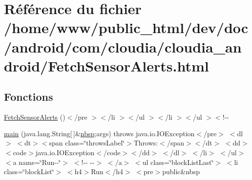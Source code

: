 \hypertarget{cloudia__android_2_fetch_sensor_alerts_8html}{\section{Référence du fichier /home/www/public\-\_\-html/dev/doc/android/com/cloudia/cloudia\-\_\-android/\-Fetch\-Sensor\-Alerts.html}
\label{cloudia__android_2_fetch_sensor_alerts_8html}
}
\subsection*{Fonctions}
\begin{DoxyCompactItemize}
\item 
\hyperlink{cloudia__android_2_fetch_sensor_alerts_8html_a0ca9d44baa13a9bbfa02515b8fdcadc0}{Fetch\-Sensor\-Alerts} ()$<$/pre $>$$<$/li $>$$<$/ul $>$$<$/li $>$$<$/ul $>$$<$!-\/-\/
\item 
\hyperlink{cloudia__android_2_fetch_sensor_alerts_8html_a0096c0bd079e6b0a3d0a15d6429c3f59}{main} (java.\-lang.\-String\mbox{[}$\,$\mbox{]}\&\hyperlink{_tools_8html_aef915316f784c9063d942974538301a6}{nbsp};args)  throws java.\-io.\-I\-O\-Exception$<$/pre$>$ $<$dl$>$ $<$dt$>$$<$span class=\char`\"{}throws\-Label\char`\"{}$>$\-Throws\-:$<$/span$>$$<$/dt$>$ $<$dd$>$$<$code$>$java.\-io.\-I\-O\-Exception$<$/code$>$$<$/dd$>$ $<$/dl$>$ $<$/li$>$ $<$/ul$>$ $<$a name=\char`\"{}\-Run-\/-\/\char`\"{}$>$ $<$!-\/-\/   -\/-\/$>$ $<$/a$>$ $<$ul class=\char`\"{}block\-List\-Last\char`\"{}$>$ $<$li class=\char`\"{}block\-List\char`\"{}$>$ $<$h4$>$\-Run$<$/h4$>$ $<$pre$>$public\&nbsp
\item 
$$
\end{DoxyCompactItemize}
